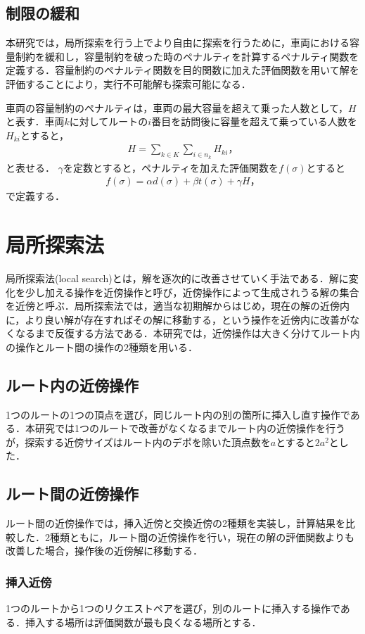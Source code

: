 \documentclass[a4j,11pt,twocolumn]{jsarticle}
\begin{document}
\subsection{{\large 制限の緩和}}
本研究では，局所探索を行う上でより自由に探索を行うために，車両における容量制約を緩和し，容量制約を破った時のペナルティを計算するペナルティ関数を定義する．容量制約のペナルティ関数を目的関数に加えた評価関数を用いて解を評価することにより，実行不可能解も探索可能になる．

車両の容量制約のペナルティは，車両の最大容量を超えて乗った人数として，$H$と表す．車両$k$に対してルートの$i$番目を訪問後に容量を超えて乗っている人数を$H_{ki}$とすると，
\begin{align*}
  H = \sum_{k \in K}\sum_{i \in n_k} H_{ki}，
\end{align*}
と表せる．
$\gamma$を定数とすると，ペナルティを加えた評価関数を$f(\sigma)$とすると
\begin{align*}
  f(\sigma) = \alpha d(\sigma)+ \beta t(\sigma) + \gamma H，
\end{align*}
で定義する．

\section{局所探索法}
局所探索法(local search)とは，解を逐次的に改善させていく手法である．解に変化を少し加える操作を近傍操作と呼び，近傍操作によって生成されうる解の集合を近傍と呼ぶ．局所探索法では，適当な初期解からはじめ，現在の解の近傍内に，より良い解が存在すればその解に移動する，という操作を近傍内に改善がなくなるまで反復する方法である．本研究では，近傍操作は大きく分けてルート内の操作とルート間の操作の2種類を用いる．

\subsection{ルート内の近傍操作}
1つのルートの1つの頂点を選び，同じルート内の別の箇所に挿入し直す操作である．本研究では1つのルートで改善がなくなるまでルート内の近傍操作を行うが，探索する近傍サイズはルート内のデポを除いた頂点数を$a$とすると$2a^2$とした．

\subsection{ルート間の近傍操作}
ルート間の近傍操作では，挿入近傍と交換近傍の2種類を実装し，計算結果を比較した．2種類ともに，ルート間の近傍操作を行い，現在の解の評価関数よりも改善した場合，操作後の近傍解に移動する．
\subsubsection{挿入近傍}
1つのルートから1つのリクエストペアを選び，別のルートに挿入する操作である．挿入する場所は評価関数が最も良くなる場所とする．
\end{document}
